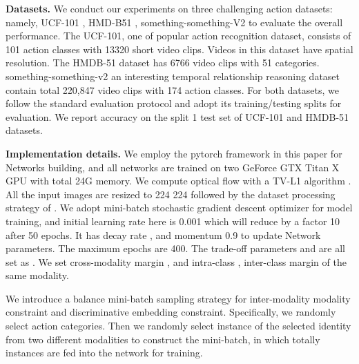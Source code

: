 \documentclass[conference,compsoc]{IEEEtran}
\begin{document}
\noindent\textbf{Datasets.} We conduct our experiments on three challenging action datasets: namely, UCF-101 \cite{soomro2012ucf101}, HMD-B51 \cite{kuehne2013hmdb51}, something-something-V2 \cite{mahdisoltani2018fine} to evaluate the overall performance. The UCF-101, one of popular action recognition dataset, consists of 101 action classes with 13320 short video clips. Videos in this dataset have  spatial resolution. The HMDB-51 dataset has 6766 video clips with 51 categories. something-something-v2 an interesting temporal relationship reasoning dataset contain total 220,847 video clips with 174 action classes. For both datasets, we follow the standard evaluation protocol and adopt its training/testing splits for evaluation. We report accuracy on the split 1 test set of UCF-101 and HMDB-51 datasets.

\noindent\textbf{Implementation details.} We employ the pytorch framework in this paper for Networks building, and all networks are trained on two GeForce GTX Titan X GPU with total 24G memory. We compute optical flow with a TV-L1 algorithm \cite{perez2013tv}. All the input images are resized to 224  224 followed by the dataset processing strategy of \cite{wang2016temporal}. We adopt mini-batch stochastic gradient descent optimizer for model training, and initial learning rate here is 0.001 which will reduce by a factor 10 after 50 epochs. It has decay rate , and momentum 0.9 to update Network parameters. The maximum epochs are 400. The trade-off parameters  and  are all set as . We set cross-modality margin , and intra-class , inter-class margin  of the same modality.

We introduce a balance mini-batch sampling strategy for inter-modality modality constraint and discriminative embedding constraint. Specifically, we randomly select  action categories. Then we randomly select  instance of the selected identity from two different modalities to construct the mini-batch, in which totally  instances are fed into the network for training.
\end{document}
